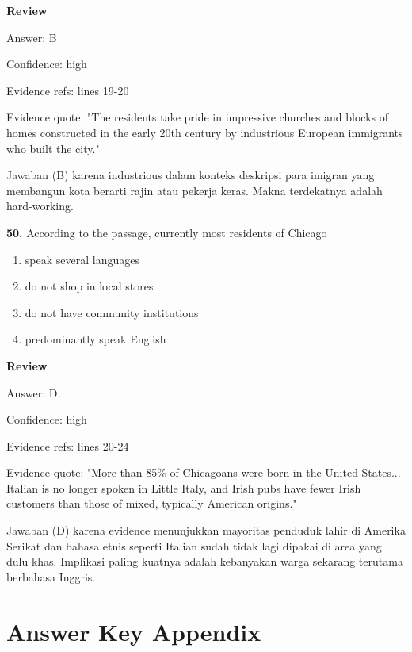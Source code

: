 \documentclass[12pt]{article}
\begin{document}
\par
\begingroup
\setlength{\parskip}{0pt}
\setlength{\parindent}{0pt}
\textbf{Review}\par
Answer: B\par
Confidence: high\par
Evidence refs: lines 19-20\par
Evidence quote: "The residents take pride in impressive churches and blocks of homes constructed in the early 20th century by industrious European immigrants who built the city."\par
Jawaban (B) karena industrious dalam konteks deskripsi para imigran yang membangun kota berarti rajin atau pekerja keras. Makna terdekatnya adalah hard-working.\par
\endgroup
\par
\vspace{0.25\baselineskip}
\noindent\textbf{50.} According to the passage, currently most residents of Chicago
\begin{enumerate}[label=(\Alph*),leftmargin=*,itemsep=0.2em]
\item speak several languages
\item do not shop in local stores
\item do not have community institutions
\item predominantly speak English
\end{enumerate}
\par
\begingroup
\setlength{\parskip}{0pt}
\setlength{\parindent}{0pt}
\textbf{Review}\par
Answer: D\par
Confidence: high\par
Evidence refs: lines 20-24\par
Evidence quote: "More than 85\% of Chicagoans were born in the United States... Italian is no longer spoken in Little Italy, and Irish pubs have fewer Irish customers than those of mixed, typically American origins."\par
Jawaban (D) karena evidence menunjukkan mayoritas penduduk lahir di Amerika Serikat dan bahasa etnis seperti Italian sudah tidak lagi dipakai di area yang dulu khas. Implikasi paling kuatnya adalah kebanyakan warga sekarang terutama berbahasa Inggris.\par
\endgroup
\par
\vspace{0.25\baselineskip}
\newpage
\section*{Answer Key Appendix}
\end{document}
